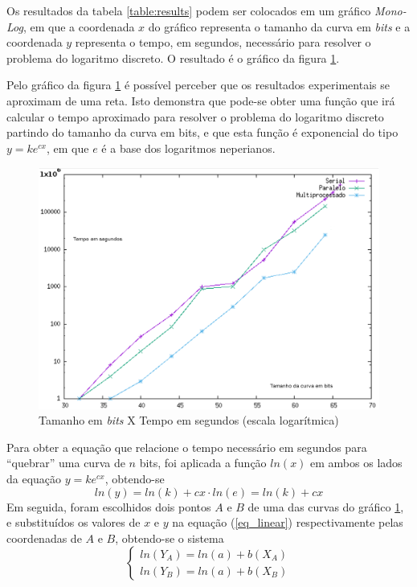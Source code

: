 Os resultados da tabela \ref{table:results} podem ser colocados em um gráfico \textit{Mono-Log}, em que a coordenada $x$ do gráfico representa o tamanho da curva em \textit{bits} e a coordenada $y$ representa o tempo, em segundos, necessário para resolver o problema do logaritmo discreto. O resultado é o gráfico da figura \ref{grafico1}.

Pelo gráfico da figura \ref{grafico1} é possível perceber que os resultados experimentais se aproximam de uma reta. Isto demonstra que pode-se obter uma função que irá calcular o tempo aproximado para resolver o problema do logaritmo discreto partindo do tamanho da curva em bits, e que esta função é exponencial do tipo \(y = ke^{cx}\), em que $e$ é a base dos logaritmos neperianos.

\begin{figure}[h]
\centering
\includegraphics[scale=0.6, bb=0 0 515 478]{figuras/grafico1.eps}
\caption{Tamanho em \textit{bits} X Tempo em segundos (escala logarítmica)}
\label{grafico1}
\end{figure}

Para obter a equação que relacione o tempo necessário em segundos para ``quebrar'' uma curva de $n$ bits, foi aplicada a função \(ln(x)\) em ambos os lados da equação \(y = ke^{cx}\), obtendo-se
\begin{equation} \label{eq_linear}
	ln(y) = ln(k) + cx\cdot ln(e) = ln(k) + cx
\end{equation}
Em seguida, foram escolhidos dois pontos \(A\) e \(B\) de uma das curvas do gráfico \ref{grafico1}, e substituídos os valores de \(x\) e \(y\) na equação (\ref{eq_linear}) respectivamente pelas coordenadas de \(A\) e \(B\), obtendo-se o sistema
\begin{equation*}
\left\{ \begin{array}{c}
ln(Y_A) = ln(a) + b(X_A)\\
ln(Y_B) = ln(a) + b(X_B)
\end{array}
\right.
\end{equation*}

